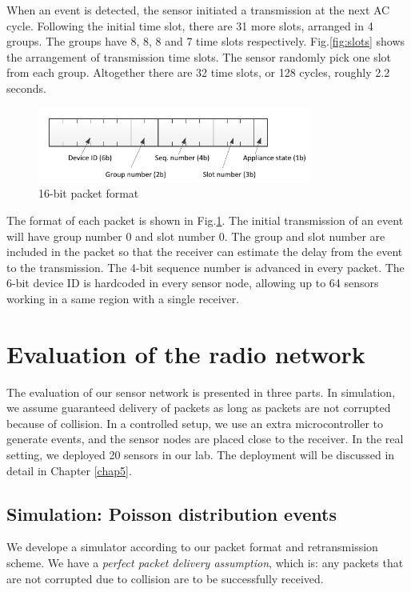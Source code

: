 When an event is detected, the sensor initiated a transmission at the next AC cycle. Following the initial time slot, there are 31 more slots, arranged in 4 groups. The groups have 8, 8, 8 and 7 time slots respectively. Fig.\ref{fig:slots} shows the arrangement of transmission time slots. The sensor randomly pick one slot from each group. Altogether there are 32 time slots, or 128 cycles, roughly 2.2 seconds. 

\begin{figure}[htb]
  \centering
  \includegraphics[width=0.8\textwidth]{figures/packet}
  \caption{16-bit packet format}
  \label{fig:packet}
\end{figure}

The format of each packet is shown in Fig.\ref{fig:packet}. The initial transmission of an event will have group number 0 and slot number 0. The group and slot number are included in the packet so that the receiver can estimate the delay from the event to the transmission. The 4-bit sequence number is advanced in every packet. The 6-bit device ID is hardcoded in every sensor node, allowing up to 64 sensors working in a same region with a single receiver. 

\section{Evaluation of the radio network}

The evaluation of our sensor network is presented in three parts. In simulation, we assume guaranteed delivery of packets as long as packets are not corrupted because of collision. In a controlled setup, we use an extra microcontroller to generate events, and the sensor nodes are placed close to the receiver. In the real setting, we deployed 20 sensors in our lab. The deployment will be discussed in detail in Chapter \ref{chap5}.

\subsection{Simulation: Poisson distribution events}

We develope a simulator according to our packet format and retransmission scheme. We have a \textit{perfect packet delivery assumption}, which is: any packets that are not corrupted due to collision are to be successfully received. 

